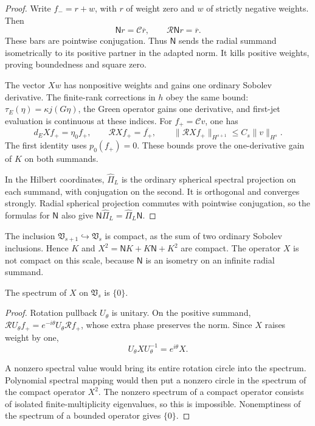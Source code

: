 \begin{proof}
Write $f_-=r+w$, with $r$ of weight zero and $w$ of strictly
negative weights. Then
\[
 \mathsf Nr=\mathcal C\overline r,\qquad
 \mathcal R\mathsf Nr=\overline r.
\]
These bars are pointwise conjugation. Thus $\mathsf N$ sends the
radial summand isometrically to its positive partner in the adapted
norm. It kills positive weights, proving boundedness and square zero.

The vector $Xw$ has nonpositive weights and gains one ordinary
Sobolev derivative. The finite-rank corrections in $h$ obey the
same bound: $\tau_E(\eta)=\kappa j(G\eta)$, the Green operator gains
one derivative, and first-jet evaluation is continuous at these
indices. For $f_+=\mathcal Cv$, one has
\[
 d_EXf_+=\eta_0f_+,\qquad
 \mathcal RXf_+=\overline{f_+},\qquad
 \|\mathcal RXf_+\|_{H^{s+1}}
       \leq C_s\|v\|_{H^s}.
\]
The first identity uses $p_0(f_+)=0$. These bounds prove the
one-derivative gain of $K$ on both summands.

In the Hilbert coordinates, $\widehat\Pi_L$ is the ordinary spherical
spectral projection on each summand, with conjugation on the second.
It is orthogonal and converges strongly. Radial spherical projection
commutes with pointwise conjugation, so the formulas for $\mathsf N$
also give $\mathsf N\widehat\Pi_L=\widehat\Pi_L\mathsf N$.
\end{proof}

The inclusion $\mathfrak V_{s+1}\hookrightarrow\mathfrak V_s$ is
compact, as the sum of two ordinary Sobolev inclusions.
Hence $K$ and $X^2=\mathsf NK+K\mathsf N+K^2$ are compact.
The operator $X$ is not compact on this scale, because
$\mathsf N$ is an isometry on an infinite radial summand.

\begin{lemma}\label{mht:lem:staggered-quasinilpotence}
The spectrum of $X$ on $\mathfrak V_s$ is $\{0\}$.
\end{lemma}

\begin{proof}
Rotation pullback $U_\theta$ is unitary. On the positive summand,
$\mathcal RU_\theta f_+=e^{-i\theta}U_\theta\mathcal Rf_+$,
whose extra phase preserves the norm. Since $X$ raises weight by one,
\[
 U_\theta XU_\theta^{-1}=e^{i\theta}X.
\]

A nonzero spectral value would bring its entire rotation circle
into the spectrum. Polynomial spectral mapping would then put a
nonzero circle in the spectrum of the compact operator $X^2$.
The nonzero spectrum of a compact operator consists of isolated
finite-multiplicity eigenvalues, so this is impossible.
Nonemptiness of the spectrum of a bounded operator gives $\{0\}$.
\end{proof}

